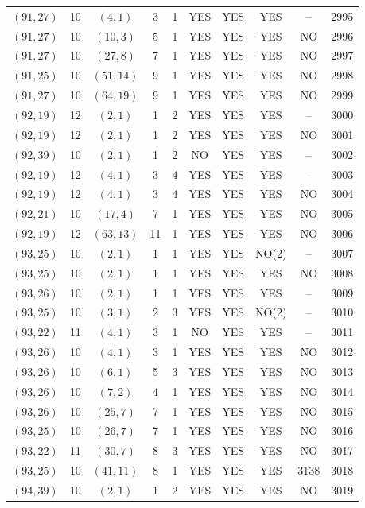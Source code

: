 \begin{longtable}{|c|c|c|c|c|c|c|c|c|c|}
$(91, 27)$ & 10 & $(4, 1)$ & 3 & 1 & YES & YES & YES & -- & 2995\\
$(91, 27)$ & 10 & $(10, 3)$ & 5 & 1 & YES & YES & YES & NO & 2996\\
$(91, 27)$ & 10 & $(27, 8)$ & 7 & 1 & YES & YES & YES & NO & 2997\\
$(91, 25)$ & 10 & $(51, 14)$ & 9 & 1 & YES & YES & YES & NO & 2998\\
$(91, 27)$ & 10 & $(64, 19)$ & 9 & 1 & YES & YES & YES & NO & 2999\\
$(92, 19)$ & 12 & $(2, 1)$ & 1 & 2 & YES & YES & YES & -- & 3000\\
$(92, 19)$ & 12 & $(2, 1)$ & 1 & 2 & YES & YES & YES & NO & 3001\\
$(92, 39)$ & 10 & $(2, 1)$ & 1 & 2 & NO & YES & YES & -- & 3002\\
$(92, 19)$ & 12 & $(4, 1)$ & 3 & 4 & YES & YES & YES & -- & 3003\\
$(92, 19)$ & 12 & $(4, 1)$ & 3 & 4 & YES & YES & YES & NO & 3004\\
$(92, 21)$ & 10 & $(17, 4)$ & 7 & 1 & YES & YES & YES & NO & 3005\\
$(92, 19)$ & 12 & $(63, 13)$ & 11 & 1 & YES & YES & YES & NO & 3006\\
$(93, 25)$ & 10 & $(2, 1)$ & 1 & 1 & YES & YES & NO(2) & -- & 3007\\
$(93, 25)$ & 10 & $(2, 1)$ & 1 & 1 & YES & YES & YES & NO & 3008\\
$(93, 26)$ & 10 & $(2, 1)$ & 1 & 1 & YES & YES & YES & -- & 3009\\
$(93, 25)$ & 10 & $(3, 1)$ & 2 & 3 & YES & YES & NO(2) & -- & 3010\\
$(93, 22)$ & 11 & $(4, 1)$ & 3 & 1 & NO & YES & YES & -- & 3011\\
$(93, 26)$ & 10 & $(4, 1)$ & 3 & 1 & YES & YES & YES & NO & 3012\\
$(93, 26)$ & 10 & $(6, 1)$ & 5 & 3 & YES & YES & YES & NO & 3013\\
$(93, 26)$ & 10 & $(7, 2)$ & 4 & 1 & YES & YES & YES & NO & 3014\\
$(93, 26)$ & 10 & $(25, 7)$ & 7 & 1 & YES & YES & YES & NO & 3015\\
$(93, 25)$ & 10 & $(26, 7)$ & 7 & 1 & YES & YES & YES & NO & 3016\\
$(93, 22)$ & 11 & $(30, 7)$ & 8 & 3 & YES & YES & YES & NO & 3017\\
$(93, 25)$ & 10 & $(41, 11)$ & 8 & 1 & YES & YES & YES & 3138 & 3018\\
$(94, 39)$ & 10 & $(2, 1)$ & 1 & 2 & YES & YES & YES & NO & 3019\\

\end{longtable}
